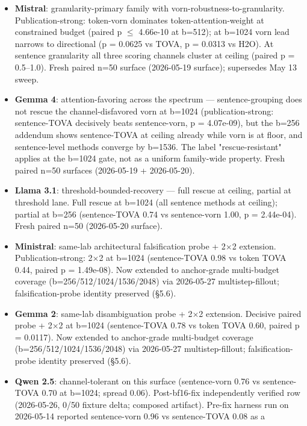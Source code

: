 \documentclass[10pt]{article}
\providecommand{\tightlist}{%
 \setlength{\itemsep}{0pt}\setlength{\parskip}{0pt}}
\begin{document}
\begin{itemize}
\tightlist
\item
 \textbf{Mistral}: granularity-primary family with
 vorn-robustness-to-granularity. Publication-strong: token-vorn
 dominates token-attention-weight at constrained budget (paired p $\leq$
 4.66e-10 at b=512); at b=1024 vorn lead narrows to directional (p =
 0.0625 vs TOVA, p = 0.0313 vs H2O). At sentence
 granularity all three scoring channels cluster at ceiling (paired p =
 0.5--1.0). Fresh paired n=50 surface (2026-05-19 surface); supersedes
 May 13 sweep.
\item
 \textbf{Gemma 4}: attention-favoring across the spectrum ---
 sentence-grouping does not rescue the channel-disfavored vorn at
 b=1024 (publication-strong: sentence-TOVA
 decisively beats sentence-vorn, p = 4.07e-09), but the b=256
 addendum shows sentence-TOVA at ceiling already while vorn is
 at floor, and sentence-level methods converge by b=1536. The label
 "rescue-resistant" applies at the b=1024 gate, not as a uniform
 family-wide property. Fresh paired n=50 surfaces (2026-05-19 +
 2026-05-20).
\item
 \textbf{Llama 3.1}: threshold-bounded-recovery --- full rescue at
 ceiling, partial at threshold lane. Full rescue at b=1024 (all
 sentence methods at ceiling); partial at b=256 (sentence-TOVA 0.74 vs
 sentence-vorn 1.00, p = 2.44e-04). Fresh paired n=50 (2026-05-20
 surface).
\item
 \textbf{Ministral}: same-lab architectural falsification probe + 2$\times$2
 extension. Publication-strong: 2$\times$2 at b=1024 (sentence-TOVA 0.98 vs
 token TOVA 0.44, paired p = 1.49e-08). Now extended to anchor-grade
 multi-budget coverage (b=256/512/1024/1536/2048) via 2026-05-27
 multistep-fillout; falsification-probe identity preserved (\S{}5.6).
\item
 \textbf{Gemma 2}: same-lab disambiguation probe + 2$\times$2 extension.
 Decisive paired probe + 2$\times$2 at b=1024 (sentence-TOVA 0.78 vs token
 TOVA 0.60, paired p = 0.0117). Now extended to anchor-grade
 multi-budget coverage (b=256/512/1024/1536/2048) via 2026-05-27
 multistep-fillout; falsification-probe identity preserved (\S{}5.6).
\item
 \textbf{Qwen 2.5}: channel-tolerant on this surface
 (sentence-vorn 0.76 vs sentence-TOVA 0.70 at b=1024; spread 0.06).
 Post-bf16-fix independently verified row (2026-05-26,
 0/50 fixture delta; composed artifact). Pre-fix harness run on
 2026-05-14 reported sentence-vorn 0.96 vs sentence-TOVA 0.08 as a

\end{itemize}
\end{document}
